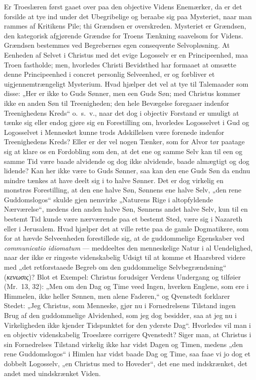 \documentclass[12pt]{book}
\begin{document}
Er Troeslæren først gaaet over paa den objective Videns Enemærker,
da er det forsilde at tye ind under det Ubegribelige og beraabe sig
paa Mysteriet, naar man rammes af Kritikens Pile; thi Grændsen er
overskreden. Mysteriet er Grændsen, den kategorisk afgjørende
Grændse for Troens Tænkning saavelsom for Videns. Grændsen bestemmes
ved Begrebernes egen conseqvente Selvopløsning. At Eenheden af
Selvet i Christus med det evige Logosselv er en Principeenhed, maa
Troen fastholde; men, hvorledes Christi Bevidsthed har formaaet at
omsætte denne Principeenhed i concret personlig Selveenhed, er og
forbliver et uigjennemtrængeligt Mysterium. Hvad hjælper det vel at
tye til Talemaader som disse: „Her er ikke to Guds Sønner, men een
Guds Søn; med Christus kommer ikke en anden Søn til Treenigheden;
den hele Bevægelse foregaaer indenfor Treenighedens Kreds“
o.\ s.\ v., naar det dog i objectiv Forstand er umuligt at tænke sig
eller endog gjøre sig en Forestilling om, hvorledes Logosselvet i
Gud og Logosselvet i Mennesket kunne trods Adskillelsen være
forenede indenfor Treenighedens Kreds? Eller er der vel nogen
Tænker, som for Alvor tør paatage sig at klare os en Fordobling som
den, at det ene og samme Selv kan til een og samme Tid være baade
alvidende og dog ikke alvidende, baade almægtigt og dog lidende? Kan
her ikke være to Guds Sønner, saa kan den ene Guds Søn da endnu
mindre tænkes at have deelt sig i to halve Sønner. Det er dog
virkelig en monstrøs Forestilling, at den ene halve Søn, Sønnens ene
halve Selv, „den rene Guddomslogos“ skulde gjen\-
nemvirke „Naturens Rige i altopfyldende Nærværelse“, medens den
anden halve Søn, Sønnens andet halve Selv, kun til en bestemt Tid
kunde være nærværende paa et bestemt Sted, være sig i Nazareth eller
i Jerusalem. Hvad hjælper det at ville rette paa de gamle
Dogmatikere, som for at hævde Selveenheden forestillede sig, at de
guddommelige Egenskaber ved \textit{communicatio idiomatum} ---
meddeeltes den menneskelige Natur i al Uendelighed, naar der ikke er
ringeste videnskabelig Udsigt til at komme et Haarsbred videre med
„det retforstaaede Begreb om den guddommelige Selvbegrændsning“
(\textit{κενωσις})?
Blot et Exempel: Christus forudsiger Verdens
Undergang og tilføier (Mr.\ 13, 32): „Men om den Dag og Time veed
Ingen, hverken Englene, som ere i Himmelen, ikke heller Sønnen, men
alene Faderen,“ og Qvenstedt forklarer Stedet: „Jeg Christus, som
Menneske, gjør nu i Fornedrelsens Tilstand ingen Brug af den
guddommelige Alvidenhed, som jeg dog besidder, saa at jeg nu i
Virkeligheden ikke kjender Tidspunktet for den yderste Dag“.
Hvorledes vil man i en objectiv videnskabelig Troeslære corrigere
Qvenstedt? Siger man, at Christus i sin Fornedrelses Tilstand
virkelig ikke har vidst Dagen og Timen, medens „den rene
Guddomslogos“ i Himlen har vidst baade Dag og Time, saa faae vi jo
dog et dobbelt Logosselv, „en Christus med to Hoveder“, det ene med
indskrænket, det andet med uindskrænket Viden.
\end{document}
